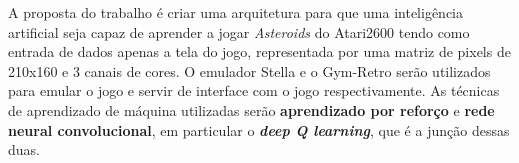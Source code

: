 A proposta do trabalho é criar uma arquitetura para que uma inteligência artificial seja capaz de aprender a jogar \textit{Asteroids} do Atari2600 tendo como entrada de dados apenas a tela do jogo, representada por uma matriz de pixels de 210x160 e 3 canais de cores.
O emulador Stella e o Gym-Retro serão utilizados para emular o jogo e servir de interface com o jogo respectivamente.
As técnicas de aprendizado de máquina utilizadas serão \textbf{aprendizado por reforço} e \textbf{rede neural convolucional}, em particular o \textbf{\textit{deep Q learning}}, que é a junção dessas duas.
